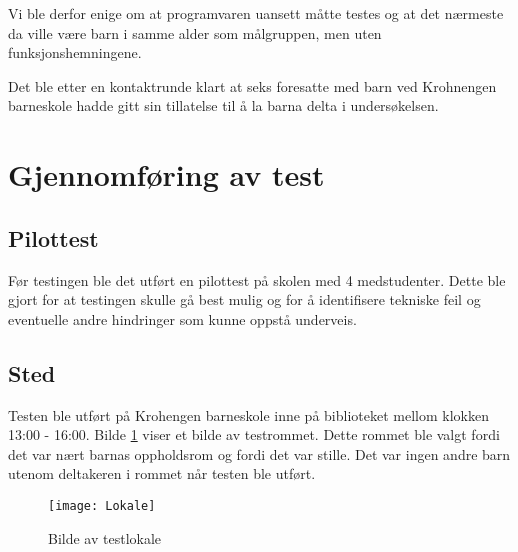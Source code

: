 Vi ble derfor enige om at programvaren uansett måtte testes og at det nærmeste da ville være barn i samme alder som målgruppen, men uten funksjonshemningene. 

Det ble etter en kontaktrunde klart at seks foresatte med barn ved Krohnengen barneskole hadde gitt sin tillatelse til å la barna delta i undersøkelsen. 
 
 
\section{Gjennomføring av test} 
 
 
\subsection{Pilottest} 
 
 
Før testingen ble det utført en pilottest på skolen med 4 medstudenter. Dette ble gjort for at testingen skulle gå best mulig og for å identifisere tekniske feil og eventuelle andre hindringer som kunne oppstå underveis.  
 
 
\subsection{Sted} 
Testen ble utført på Krohengen barneskole inne på biblioteket mellom klokken 13:00 - 
16:00. Bilde \ref{fig:test_lokale} viser et bilde av testrommet. Dette rommet ble valgt fordi det var nært barnas oppholdsrom og fordi det var 
stille. Det var ingen andre barn utenom deltakeren i rommet når testen ble utført. 

 
 
\begin{figure}[ht!] 
\centering 
\texttt{[image: Lokale]} 
\caption{Bilde av testlokale} 
\label{fig:test_lokale} 
\end{figure} 
 
 

